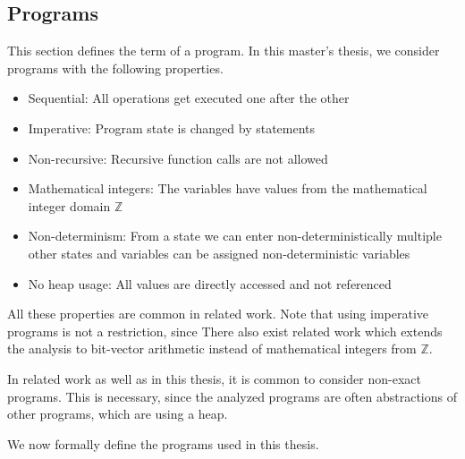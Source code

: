 \subsection{Programs}

This section defines the term of a program.
In this master's thesis, we consider programs with the following properties.

\begin{itemize}
\item Sequential: All operations get executed one after the other
\item Imperative: Program state is changed by statements
\item Non-recursive: Recursive function calls are not allowed
\item Mathematical integers: The variables have values from the mathematical integer domain $\mathbb{Z}$
\item Non-determinism: From a state we can enter non-deterministically multiple other states and variables can be assigned non-deterministic variables
\item No heap usage: All values are directly accessed and not referenced
\end{itemize}

All these properties are common in related work.
Note that using imperative programs is not a restriction, since 
There also exist related work which extends the analysis to bit-vector arithmetic instead of mathematical integers from $\mathbb{Z}$. \cite{bitvectorarithmetic}

In related work as well as in this thesis, it is common to consider non-exact programs.
This is necessary, since the analyzed programs are often abstractions of other programs, which are using a heap.


We now formally define the programs used in this thesis.

